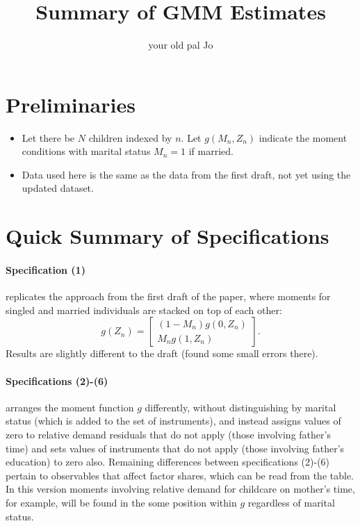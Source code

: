 \documentclass{article}
\title{Summary of GMM Estimates}
\author{your old pal Jo}
\begin{document}
\maketitle
\section*{Preliminaries}
\begin{itemize}
    \item Let there be $N$ children indexed by $n$. Let $g(M_{n},Z_{n})$ indicate the moment conditions with marital status $M_{n}=1$ if married.
    \item Data used here is the same as the data from the first draft, not yet using the updated dataset.
\end{itemize}

\section*{Quick Summary of Specifications}

\paragraph{Specification (1)} replicates the approach from the first draft of the paper, where moments for singled and married individuals are stacked on top of each other:
\[ g(Z_{n}) = \left[\begin{array}{c}(1-M_{n})g(0,Z_{n}) \\ M_{n} g(1,Z_{n})\end{array}\right].\]
Results are slightly different to the draft (found some small errors there).

\paragraph{Specifications (2)-(6)} arranges the moment function $g$ differently, without distinguishing by marital status (which is added to the set of instruments), and instead assigns values of zero to relative demand residuals that do not apply (those involving father's time) and sets values of instruments that do not apply (those involving father's education) to zero also. Remaining differences between specifications (2)-(6) pertain to observables that affect factor shares, which can be read from the table. In this version moments involving relative demand for childcare on mother's time, for example, will be found in the some position within $g$ regardless of marital status.
\end{document}
